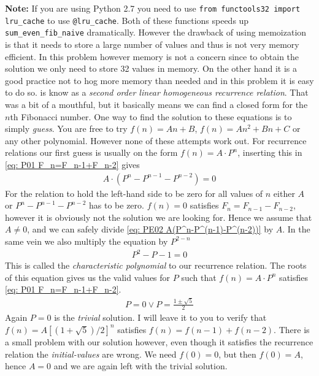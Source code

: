 %
\textbf{Note:} If you are using Python 2.7 you need to use \verb|from functools32 import lru_cache| to use \verb|@lru_cache|. Both of
these functions speeds up \verb|sum_even_fib_naive| dramatically. However the drawback of using memoization is that it needs to store
a large number of values and thus is not very memory efficient. In this problem however memory is not a concern since to obtain
the solution we only need to store 32 values in memory. 
%
On the other hand it is a good practice not to hog more memory than needed and in this problem it is easy to do so. 
is know as a \emph{second order linear homogeneous recurrence relation}. That was a bit of a mouthful, but it basically means we can find a
closed form for the $n$th Fibonacci number. One way to find the solution to these equations is to simply \emph{guess}. 
You are free to try $f(n) = An + B$, $f(n) = A n^2 + B n + C $ or any other polynomial. However none of these attempts work out. For
recurrence relations our first guess is usually on the form $f(n) = A \cdot P^n$, inserting this in \cref{eq: P01 F_n=F_n-1+F_n-2} gives
%
\begin{align}
	\label{eq: PE02 A(P^n-P^(n-1)-P^(n-2))}
	A \cdot (P^n - P^{n-1} - P^{n-2}) = 0
\end{align}
%
For the relation to hold the left-hand side to be zero for all values of $n$ either $A$ or $P^n - P^{n-1} - P^{n-2}$ has to be zero.
$f(n) = 0$ satisfies $F_n = F_{n-1} - F_{n-2}$, however it is obviously not the solution we are looking for. Hence
we assume that $A \neq 0$, and we can safely divide \cref{eq: PE02 A(P^n-P^(n-1)-P^(n-2))} by $A$. In the same vein we also
multiply the equation by $P^{2-n}$
\begin{align*}
	P^2 - P - 1 = 0
\end{align*}
% 
This is called the \emph{characteristic polynomial} to our recurrence relation. The roots of this equation gives us 
the valid values for $P$ such that $f(n) = A \cdot P^n$ satisfies \cref{eq: P01 F_n=F_n-1+F_n-2}. 
%
\begin{align*}
	P = 0 \vee P = \frac{1 \pm \sqrt{5}}{2}
\end{align*}
%
Again $P = 0$ is the \emph{trivial} solution. I will leave it to you to verify that $f(n) = A [ (1 + \sqrt{5})/2]^n$ satisfies
$f(n) = f(n-1) + f(n-2)$. There is a small problem with our solution however, even though it satisfies the recurrence relation 
the \emph{initial-values} are wrong. We need $f(0)=0$, but then $f(0) = A$, hence $A = 0$ and we are again left with the trivial solution.

